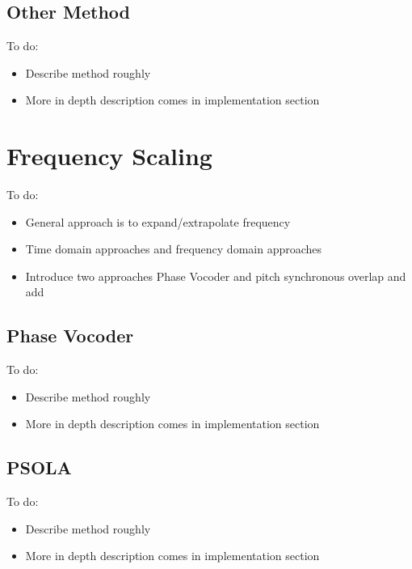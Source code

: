 \subsection{Other Method}

\color{red}
To do:
\begin{itemize}
	\item Describe method roughly
	\item More in depth description comes in implementation section
\end{itemize}
\color{black}

\section{Frequency Scaling}

\color{red}
To do:
\begin{itemize}
	\item General approach is to expand/extrapolate frequency
	\item Time domain approaches and frequency domain approaches
	\item Introduce two approaches Phase Vocoder and pitch synchronous overlap and add
\end{itemize}
\color{black}

\subsection{Phase Vocoder}

\color{red}
To do:
\begin{itemize}
	\item Describe method roughly
	\item More in depth description comes in implementation section
\end{itemize}
\color{black}

\subsection{PSOLA}

\color{red}
To do:
\begin{itemize}
	\item Describe method roughly
	\item More in depth description comes in implementation section
\end{itemize}
\color{black}

